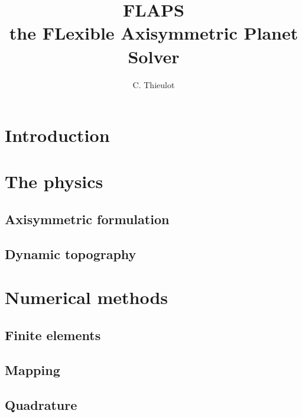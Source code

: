 \documentclass[a4paper]{article}
\begin{document}
\title{FLAPS \\ the FLexible Axisymmetric Planet Solver}
\author{C. Thieulot}
\maketitle

\section{Introduction}



\section{The physics}

\subsection{Axisymmetric formulation}

\subsection{Dynamic topography}


\section{Numerical methods}

\subsection{Finite elements}

\subsection{Mapping}

\subsection{Quadrature}
\end{document}

